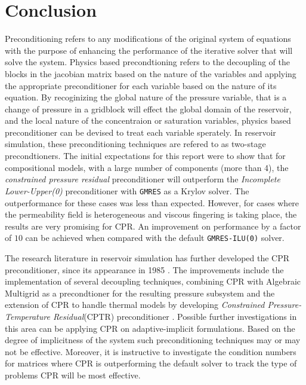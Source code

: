 \chapter{Conclusion}
Preconditioning refers to any modifications of the original system of equations with the purpose of enhancing the performance of
the iterative solver that will solve the system. Physics based precondtioning refers to the decoupling of the blocks in the jacobian
matrix based on the nature of the variables and applying the appropriate preconditioner for each variable based on the nature of its equation.
By recoginizing the global nature of the pressure variable, that is a change of pressure in a gridblock will effect the
global domain of the reservoir, and the local nature of the concentraion or saturation variables, physics based preconditioner can be devised
to treat each variable sperately. In reservoir simulation, these preconditioning techniques are refered to as two-stage precondtioners.
The initial expectations for this report were to show that for compositional models, with a large number of components (more than 4), 
the \textit{constrained pressure residual} preconditioner will outperform the \textit{Incomplete Lower-Upper(0)} preconditioner 
with \texttt{GMRES} as a Krylov solver. The outperformance for these cases was less than expected. However, for cases where 
the permeability field is heterogeneous and viscous fingering is taking place, the results are very promising for CPR. 
An improvement on performance by a factor of $10$ can be achieved when compared with the default \texttt{GMRES-ILU(0)} solver.

The research literature in reservoir simulation has further developed the CPR preconditioner, 
since its appearance in 1985 \cite{Wallis_1985}. The improvements include the implementation of several decoupling techniques, combining
CPR with Algebraic Multigrid as a precondtioner for the resulting pressure subsystem and the extension of CPR to handle thermal models by
developing \textit{Constrained Pressure-Temperature Residual}(CPTR) preconditioner \cite{cptr}.
Possible further investigations in this area can be applying CPR on adaptive-implicit formulations. Based on the degree of implicitness of the
system such preconditioning techniques may or may not be effective. Moreover, it is instructive to investigate the condition numbers for matrices
where CPR is outperforming the default solver to track the type of problems CPR will be most effective.
